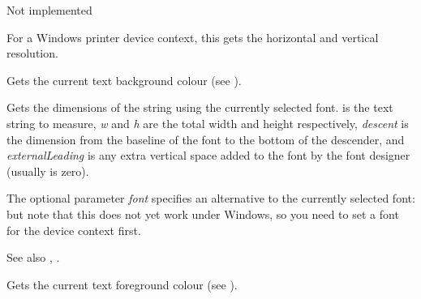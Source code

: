 Not implemented

\label{wxdcgetsize}



For a Windows printer device context, this gets the horizontal and vertical
resolution. 

\label{wxdcgettextbackground}



Gets the current text background colour (see ).

\label{wxdcgettextextent}


Gets the dimensions of the string using the currently selected font.
 is the text string to measure, {\it w} and {\it h} are
the total width and height respectively, {\it descent} is the
dimension from the baseline of the font to the bottom of the
descender, and {\it externalLeading} is any extra vertical space added
to the font by the font designer (usually is zero).

The optional parameter {\it font} specifies an alternative
to the currently selected font: but note that this does not
yet work under Windows, so you need to set a font for
the device context first.

See also , .

\label{wxdcgettextforeground}



Gets the current text foreground colour (see ).


\label{wxdcgetuserscale}

